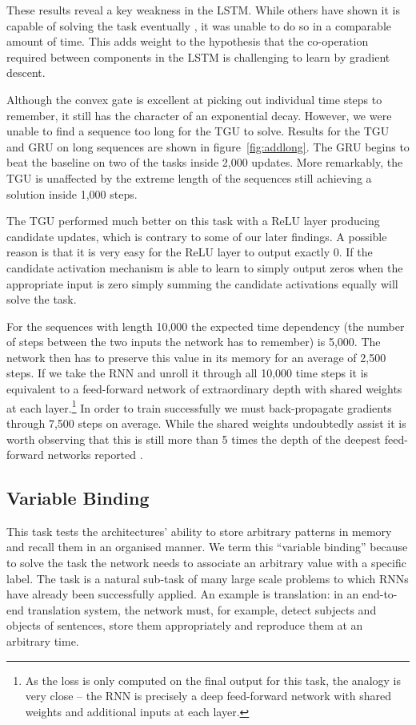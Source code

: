 These results reveal a key weakness in the LSTM. While others have shown 
it is capable of solving the task eventually \autocite{Henaff2016}, it was unable to do so in a comparable
amount of time.
This adds weight to the hypothesis that the co-operation required between components in the LSTM 
is challenging to learn by gradient descent.

Although the convex gate is excellent at picking out individual time steps to remember, it still
has the character of an exponential decay. However, 
we were unable to find a sequence too long for the TGU to solve. 
Results for the TGU and GRU on long sequences are shown in 
figure~\ref{fig:addlong}. The GRU begins to beat the baseline on two of the
tasks inside 2,000 updates. More remarkably, the TGU is unaffected by the
extreme length of the sequences still achieving a solution inside 1,000 steps.

The TGU performed much better on this task with a ReLU layer producing candidate updates,
which is contrary to some of our later findings.
A possible reason is that it is very easy for the ReLU layer to output exactly \(0\).
If the candidate activation mechanism is able to learn to simply output zeros when the appropriate
input is zero simply summing the candidate activations equally will solve the task.

For the sequences with length 10,000 the expected time dependency (the number of steps between the
two inputs the network has to remember) is 5,000. The network then has to preserve this value in its
memory for an average of 2,500 steps. If we take the RNN and unroll it through all 10,000
time steps it is equivalent to a feed-forward network of extraordinary depth with shared weights at each
layer.\footnote{As the loss is only computed on the final output for this task, the analogy is very
close -- the RNN is precisely a deep feed-forward network with shared weights and additional inputs
at each layer.} In order to train successfully we must back-propagate gradients through
7,500 steps on average. While the shared weights undoubtedly assist it is worth observing that this
is still more than 5 times the depth of the deepest feed-forward networks reported
\autocite{Huang2016}.


\subsection{Variable Binding}
This task tests the architectures' ability to store arbitrary patterns in memory and
recall them in an organised manner. We term this ``variable binding'' because
to solve the task the network needs
to associate an arbitrary value with a specific label. The task is a natural
sub-task of many large scale problems to which RNNs have already been successfully applied.
An example is translation: in an end-to-end translation system, the network must, for example,
detect subjects and objects of sentences, store them appropriately and reproduce them at an
arbitrary time.

